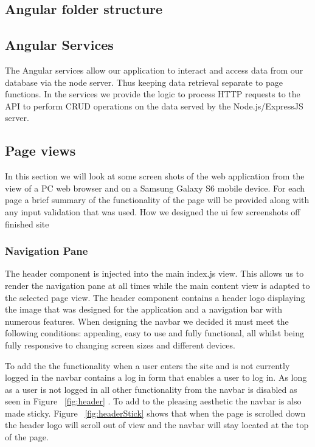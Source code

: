 \subsection{Angular folder structure}

\subsection{Angular Services}
The Angular services allow our application to interact and access data from our database via the node server. Thus keeping data retrieval separate to page functions. In the services we provide the logic to process HTTP requests to the API to perform CRUD operations on the data served by the Node.js/ExpressJS server. 

\subsection{Page views}
In this section we will look at some screen shots of the web application from the view of a PC web browser and on a Samsung Galaxy S6 mobile device. For each page a brief summary of the functionality of the page will be provided along with any input validation that was used. 
How we designed the ui
few screenshots off finished site


\subsubsection{Navigation Pane}
The header component is injected into the main index.js view. This allows us to render the navigation pane at all times while the main content view is adapted to the selected page view. The header component contains a header logo displaying the image that was designed for the application and a navigation bar with numerous features. When designing the navbar we decided it must meet the following conditions: appealing, easy to use and fully functional, all whilst being fully responsive to changing screen sizes and different devices.

To add the the functionality when a user enters the site and is not currently logged in the navbar contains a log in form that enables a user to log in. As long as a user is not logged in all other functionality from the navbar is disabled as seen in Figure ~\ref{fig:header} . To add to the pleasing aesthetic the navbar is also made sticky. Figure ~\ref{fig:headerStick} shows that when the page is scrolled down the header logo will scroll out of view and the navbar will stay located at the top of the page.

